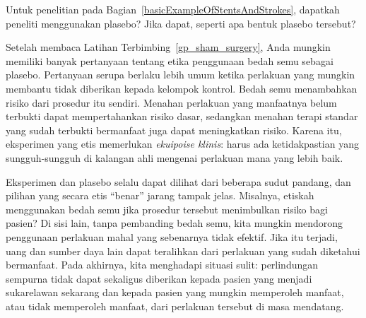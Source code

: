 \begin{exercisewrap}
\begin{nexercise}
\label{gp_sham_surgery}%
Untuk penelitian pada Bagian~\ref{basicExampleOfStentsAndStrokes}, dapatkah
peneliti menggunakan plasebo? Jika dapat, seperti apa bentuk plasebo
tersebut?\footnotemark{}
\end{nexercise}
\end{exercisewrap}

Setelah membaca Latihan Terbimbing~\ref{gp_sham_surgery}, Anda mungkin memiliki
banyak pertanyaan tentang etika penggunaan bedah semu sebagai plasebo.
Pertanyaan serupa berlaku lebih umum ketika perlakuan yang mungkin membantu
tidak diberikan kepada kelompok kontrol. Bedah semu menambahkan risiko dari
prosedur itu sendiri. Menahan perlakuan yang manfaatnya belum terbukti dapat
mempertahankan risiko dasar, sedangkan menahan terapi standar yang sudah terbukti
bermanfaat juga dapat meningkatkan risiko. Karena itu, eksperimen yang etis
memerlukan \emph{ekuipoise klinis}: harus ada ketidakpastian yang sungguh-sungguh
di kalangan ahli mengenai perlakuan mana yang lebih baik.

Eksperimen dan plasebo selalu dapat dilihat dari beberapa sudut pandang, dan
pilihan yang secara etis ``benar'' jarang tampak jelas. Misalnya, etiskah
menggunakan bedah semu jika prosedur tersebut menimbulkan risiko bagi pasien?
Di sisi lain, tanpa pembanding bedah semu, kita mungkin mendorong penggunaan
perlakuan mahal yang sebenarnya tidak efektif. Jika itu terjadi, uang dan
sumber daya lain dapat teralihkan dari perlakuan yang sudah diketahui
bermanfaat. Pada akhirnya, kita menghadapi situasi sulit: perlindungan sempurna
tidak dapat sekaligus diberikan kepada pasien yang menjadi sukarelawan sekarang
dan kepada pasien yang mungkin memperoleh manfaat, atau tidak memperoleh
manfaat, dari perlakuan tersebut di masa mendatang.


{}
